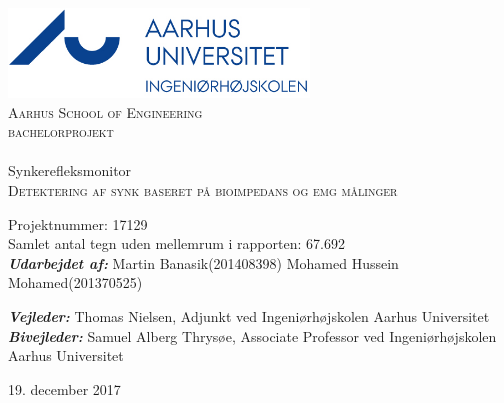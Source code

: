 
\begin{titlingpage}
\begin{center}

~ \\[3cm]

\includegraphics[width=0.6\textwidth]{figure/AU}~\\[1cm]

\textsc{\LARGE Aarhus School of Engineering}\\[1.5cm]

\textsc{\Large bachelorprojekt}\\

\noindent\makebox[\linewidth]{\rule{\textwidth}{0.4pt}}\\
[0.5cm]{\Huge Synkerefleksmonitor}\\
\textsc{Detektering af synk baseret på bioimpedans og emg målinger}
\noindent\makebox[\linewidth]{\rule{\textwidth}{0.4pt}}

\end{center}


Projektnummer: 17129 \newline\\
Samlet antal tegn uden mellemrum i rapporten: 67.692 \newline\\
\textbf{\textit{Udarbejdet af:}} \newline
Martin Banasik\tab(201408398) \newline	
Mohamed Hussein Mohamed\tab(201370525) \newline	





\textbf{\textit{Vejleder:}} \newline
Thomas Nielsen, Adjunkt ved Ingeniørhøjskolen Aarhus Universitet\\
\textbf{\textit{Bivejleder:}} \newline
Samuel Alberg Thrysøe, Associate Professor ved Ingeniørhøjskolen Aarhus Universitet\\


\vfill

\begin{center}
{\large 19. december 2017}
\end{center}


\end{titlingpage}